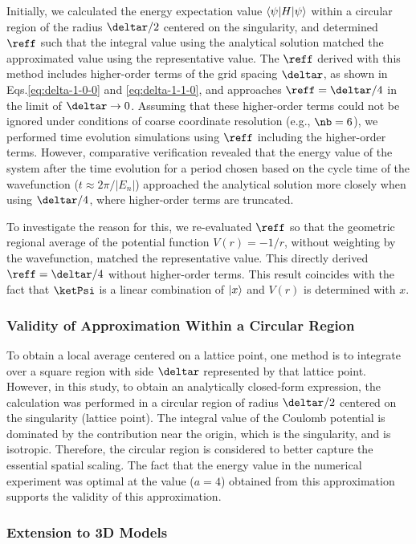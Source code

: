 \documentclass[manuscript_main.tex]{subfiles}
\begin{document}
Initially, we calculated the energy expectation value $\braket{\psi|H|\psi}$
within a circular region of the radius $\deltar/2$ centered on the singularity,
and determined $\reff$ such that the integral value using the analytical
solution matched the approximated value using the representative value. The
$\reff$ derived with this method includes higher-order terms of the grid spacing
$\deltar$, as shown in Eqs.\eqref{eq:delta-1-0-0} and \eqref{eq:delta-1-1-0},
and approaches $\reff=\deltar/4$ in the limit of $\deltar\rightarrow0$. Assuming
that these higher-order terms could not be ignored under conditions of coarse
coordinate resolution (e.g., $\nb=6$), we performed time evolution simulations
using $\reff$ including the higher-order terms. However, comparative
verification revealed that the energy value of the system after the time
evolution for a period chosen based on the cycle time of the wavefunction
($t\approx 2\pi/|E_n|$) approached the analytical solution more closely when
using $\deltar/4$, where higher-order terms are truncated.

To investigate the reason for this, we re-evaluated $\reff$ so that the
geometric regional average of the potential function $V(r)=-1/r$, without
weighting by the wavefunction, matched the representative value. This directly
derived $\reff=\deltar/4$ without higher-order terms.  This result coincides
with the fact that $\ketPsi$ is a linear combination of $\ket{x}$ and $V(r)$ is
determined with $x$.

\subsubsection{Validity of Approximation Within a Circular Region}
To obtain a local average centered on a lattice point, one method is to
integrate over a square region with side $\deltar$ represented by that lattice
point. However, in this study, to obtain an analytically closed-form expression,
the calculation was performed in a circular region of radius $\deltar/2$
centered on the singularity (lattice point). The integral value of the Coulomb
potential is dominated by the contribution near the origin, which is the
singularity, and is isotropic. Therefore, the circular region is considered to
better capture the essential spatial scaling. The fact that the energy value in
the numerical experiment was optimal at the value ($a=4$) obtained from this
approximation supports the validity of this approximation.

\subsubsection{Extension to 3D Models}
\label{subsec:discussion-3d-extension}
\end{document}
